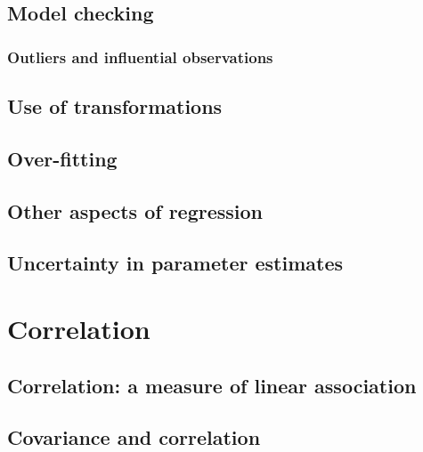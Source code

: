 \documentclass[
  11pt,
  british,
  openany, a4paper]{book}
\begin{document}
\hypertarget{model-checking}{%
\section{Model checking}\label{model-checking}}

\hypertarget{outliers}{%
\subsection{Outliers and influential observations}\label{outliers}}

\hypertarget{linregtrans}{%
\section{Use of transformations}\label{linregtrans}}

\hypertarget{over-fitting}{%
\section{Over-fitting}\label{over-fitting}}

\hypertarget{other-aspects-of-regression}{%
\section{Other aspects of regression}\label{other-aspects-of-regression}}

\hypertarget{uncertainty-in-parameter-estimates}{%
\section{Uncertainty in parameter estimates}\label{uncertainty-in-parameter-estimates}}

\hypertarget{correlationchapter}{%
\chapter{Correlation}\label{correlationchapter}}

\hypertarget{correlation-a-measure-of-linear-association}{%
\section{Correlation: a measure of linear association}\label{correlation-a-measure-of-linear-association}}

\hypertarget{covariance-and-correlation}{%
\section{Covariance and correlation}\label{covariance-and-correlation}}
\end{document}
